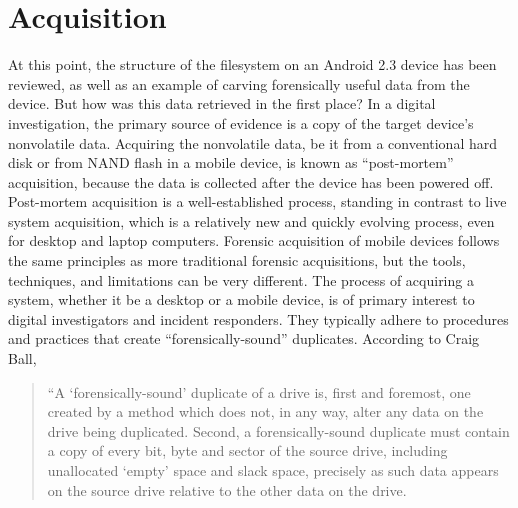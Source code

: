\section{Acquisition}
At this point, the structure of the filesystem on an Android 2.3 device has been reviewed, as well as an example of carving
forensically useful data from the device. But how was this data retrieved in the first place? In a digital investigation, the
primary source of evidence is a copy of the target device's nonvolatile data.  Acquiring the nonvolatile data, be it from a
conventional hard disk or from NAND flash in a mobile device, is known as ``post-mortem'' acquisition, because the data is
collected after the device has been powered off.  Post-mortem acquisition is a well-established process, standing in contrast to
live system acquisition, which is a relatively new and quickly evolving process, even for desktop and laptop computers.  Forensic
acquisition of mobile devices follows the same principles as more traditional forensic acquisitions, but the tools, techniques, and
limitations can be very different. The process of acquiring a system, whether it be a desktop or a mobile device, is of primary
interest to digital investigators and incident responders. They typically adhere to procedures and practices that create
``forensically-sound'' duplicates.  According to Craig Ball, 

\begin{quote}
“A ‘forensically-sound’ duplicate of a drive is, first and foremost, one created by a method which does not, in any way, alter any data on the drive being duplicated. 
Second, a forensically-sound duplicate must contain a copy of every bit, byte and sector of the source drive, including unallocated ‘empty’ space and slack space, precisely as such data appears on the source drive relative to the other data on the drive. 
\cite{ball}
\end{quote}

